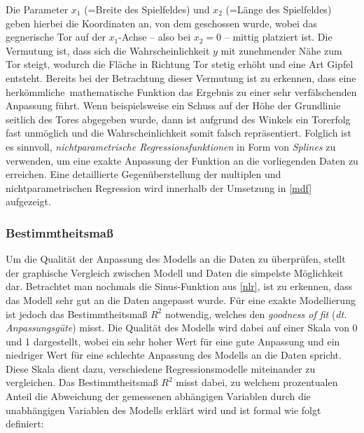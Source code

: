 Die Parameter $x_1$ (=Breite des Spielfeldes) und $x_2$ (=Länge des Spielfeldes) geben hierbei die Koordinaten an, von dem geschossen wurde, wobei das gegnerische Tor auf der $x_1$-Achse -- also bei $x_2=0$ -- mittig platziert ist. Die Vermutung ist, dass sich die Wahrscheinlichkeit $y$ mit zunehmender Nähe zum Tor steigt, wodurch die Fläche in Richtung Tor stetig erhöht und eine Art \glqq Gipfel\grqq~ entsteht. Bereits bei der Betrachtung dieser Vermutung ist zu erkennen, dass eine \glqq herkömmliche\grqq~mathematische Funktion das Ergebnis zu einer sehr verfälschenden Anpassung führt. Wenn beispielsweise ein Schuss auf der Höhe der Grundlinie seitlich des Tores abgegeben wurde, dann ist aufgrund des Winkels ein Torerfolg fast unmöglich und die Wahrscheinlichkeit somit falsch repräsentiert. Folglich ist es sinnvoll, \textit{nichtparametrische Regressionsfunktionen} in Form von \textit{Splines} zu verwenden, um eine exakte Anpassung der Funktion an die vorliegenden Daten zu erreichen. Eine detaillierte Gegenüberstellung der multiplen und nichtparametrischen Regression wird innerhalb der Umsetzung in \vref{mdf} aufgezeigt.

\subsubsection{Bestimmtheitsmaß}
\label{bhm}
Um die Qualität der Anpassung des Modells an die Daten zu überprüfen, stellt der graphische Vergleich zwischen Modell und Daten die simpelste Möglichkeit dar. Betrachtet man nochmals die Sinus-Funktion aus \vref{nlr}, ist zu erkennen, dass das Modell sehr gut an die Daten angepasst wurde. Für eine exakte Modellierung ist jedoch das Bestimmtheitsmaß $R^2$ notwendig, welches den \textit{goodness of fit} (\textit{dt. Anpassungsgüte}) misst. Die Qualität des Modells wird dabei auf einer Skala von 0 und 1 dargestellt, wobei ein sehr hoher Wert für eine gute Anpassung und ein niedriger Wert für eine schlechte Anpassung des Modells an die Daten spricht. Diese Skala dient dazu, verschiedene Regressionsmodelle miteinander zu vergleichen. Das Bestimmtheitsmaß $R^2$ misst dabei, zu welchem prozentualen Anteil die Abweichung der gemessenen abhängigen Variablen durch die unabhängigen Variablen des Modells erklärt wird und ist formal wie folgt definiert:

